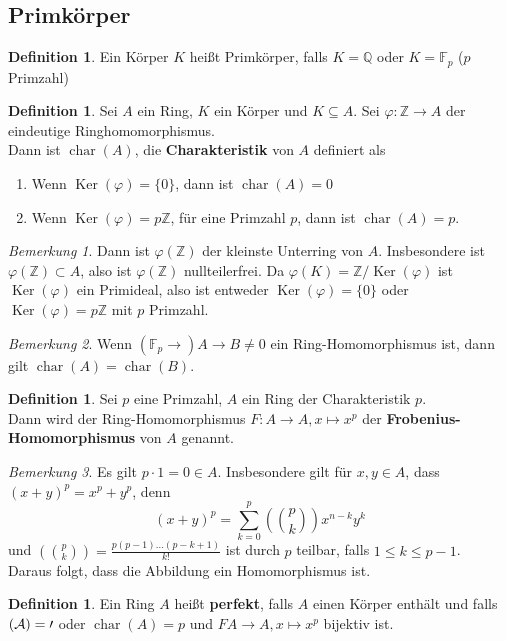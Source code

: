 \documentclass[10pt,a4paper]{article}
\newcommand{\Z}{\ensuremath{\mathbb{Z}}}
\newcommand{\Q}{\ensuremath{\mathbb{Q}}}
\newcommand{\F}{\ensuremath{\mathbb{F}}}
\newcommand{\Ker}{\ensuremath{\operatorname{Ker}}}
\newcommand{\cha}{\ensuremath{\operatorname{char}}}
\newcounter{thm}[section]
\theoremstyle{definition}
\newtheorem{definition}[thm]{Definition}
\theoremstyle{plain}
\theoremstyle{remark}
\newtheorem*{bem*}{Bemerkung}
\begin{document}
\subsection{Primkörper}
\begin{definition}
	Ein Körper $K$ heißt Primkörper, falls $K=\Q$ oder $K=\F_p$ ($p$ Primzahl)
\end{definition}

\begin{definition}
	Sei $A$ ein Ring, $K$ ein Körper und $K\subseteq A$. Sei $\varphi:\Z\to A$ der eindeutige Ringhomomorphismus.\\
	Dann ist $\cha(A)$, die \textbf{Charakteristik} von $A$ definiert als
	\begin{enumerate}
		\item Wenn $\Ker(\varphi)=\{0\}$, dann ist $\cha(A)=0$
		\item Wenn $\Ker(\varphi)=p\Z$, für eine Primzahl $p$, dann ist $\cha(A)=p$.
	\end{enumerate}
\end{definition}
\begin{bem*}
	Dann ist $\varphi(\Z)$ der kleinste Unterring von $A$. Insbesondere ist $\varphi(\Z)\subset A$, also ist $\varphi(\Z)$ nullteilerfrei. Da $\varphi(K)=\Z/\Ker(\varphi)$ ist $\Ker(\varphi)$ ein Primideal, also ist entweder $\Ker(\varphi)=\{0\}$ oder $\Ker(\varphi)=p\Z$ mit $p$ Primzahl.
\end{bem*}
\begin{bem*}
	Wenn $(\F_p\to)A\to B\neq 0$ ein Ring-Homomorphismus ist, dann gilt $\cha(A)=\cha(B)$.
\end{bem*}

\begin{definition}
	Sei $p$ eine Primzahl, $A$ ein Ring der Charakteristik $p$.\\
	Dann wird der Ring-Homomorphismus $F:A\to A,x\mapsto x^p$ der \textbf{Frobenius-Homomorphismus} von $A$ genannt.
\end{definition}
\begin{bem*}
	Es gilt $p\cdot 1=0\in A$. Insbesondere gilt für $x,y\in A$, dass $(x+y)^p=x^p+y^p$, denn
	\[(x+y)^p=\sum_{k=0}^{p}\left(p\choose k\right)x^{n-k}y^{k}\]
	und $\left(p\choose k\right)=\frac{p(p-1)...(p-k+1)}{k!}$ ist durch $p$ teilbar, falls $1\leq k\leq p-1$.\\
	Daraus folgt, dass die Abbildung ein Homomorphismus ist.
\end{bem*}
	
\begin{definition}
	Ein Ring $A$ heißt \textbf{perfekt}, falls $A$ einen Körper enthält und falls $\cal(A)=0$ oder $\cha(A)=p$ und $FA\to A,x\mapsto x^p$ bijektiv ist.
\end{definition}
\end{document}
